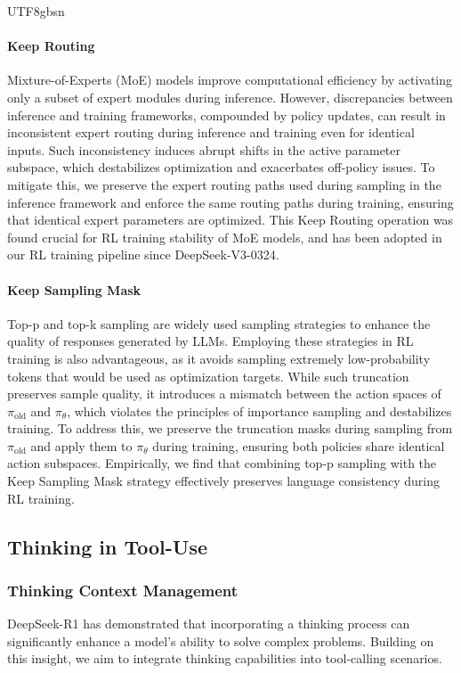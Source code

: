 \documentclass[11pt, a4paper, logo, copyright, nonumbering]{deepseek}
\newcommand{\piold}{\pi_{\mathrm{old}}}
\begin{document}
\begin{CJK*}{UTF8}{gbsn}
\paragraph{Keep Routing} Mixture-of-Experts (MoE) models improve computational efficiency by activating only a subset of expert modules during inference. However, discrepancies between inference and training frameworks, compounded by policy updates, can result in inconsistent expert routing during inference and training even for identical inputs. Such inconsistency induces abrupt shifts in the active parameter subspace, which destabilizes optimization and exacerbates off-policy issues. To mitigate this, we preserve the expert routing paths used during sampling in the inference framework and enforce the same routing paths during training, ensuring that identical expert parameters are optimized. This Keep Routing operation was found crucial for RL training stability of MoE models, and has been adopted in our RL training pipeline since DeepSeek-V3-0324.

\paragraph{Keep Sampling Mask} Top-p and top-k sampling are widely used sampling strategies to enhance the quality of responses generated by LLMs. Employing these strategies in RL training is also advantageous, as it avoids sampling extremely low-probability tokens that would be used as optimization targets. While such truncation preserves sample quality, it introduces a mismatch between the action spaces of $\piold$ and $\pi_\theta$, which violates the principles of importance sampling and destabilizes training. To address this, we preserve the truncation masks during sampling from $\piold$ and apply them to $\pi_\theta$ during training, ensuring both policies share identical action subspaces. Empirically, we find that combining top-p sampling with the Keep Sampling Mask strategy effectively preserves language consistency during RL training.

\subsection{Thinking in Tool-Use}
\label{sec:synthesis}

\subsubsection{Thinking Context Management}
DeepSeek-R1 has demonstrated that incorporating a thinking process can significantly enhance a model's ability to solve complex problems. Building on this insight, we aim to integrate thinking capabilities into tool-calling scenarios.


\end{CJK*}
\end{document}
